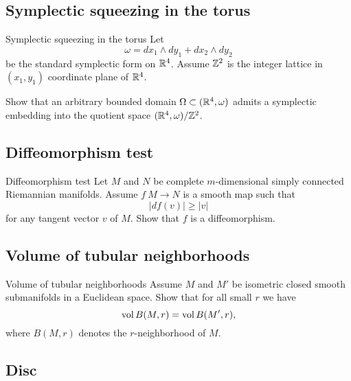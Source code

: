 \subsection*{Symplectic squeezing in the torus}




\begin{pr}{}{Symplectic squeezing in the torus}\label{Symplectic squeezing in the torus}
Let 
\[\omega=dx_1\wedge dy_1+ dx_2\wedge dy_2\]
be the standard symplectic form on $\mathbb{R}^4$.
Assume $\mathbb{Z}^2$ is the integer lattice in $(x_1,y_1)$ coordinate plane of $\mathbb{R}^4$.

Show that an arbitrary bounded domain $\Omega\subset (\mathbb{R}^4,\omega)$
admits a symplectic embedding into the quotient space $(\mathbb{R}^4,\omega)/\mathbb{Z}^2$. 
\end{pr}

\subsection*{Diffeomorphism test\easy}



\begin{pr}{\easy}{Diffeomorphism test}\label{Diffeomorphism test}
Let $M$ and $N$ be 
complete 
$m$-dimensional
simply connected 
Riemannian manifolds.
Assume $f\:M\to N$
is a smooth map such that 
$$|df(v)|\ge |v|$$
for any tangent vector $v$ of $M$.
Show that $f$ is a diffeomorphism.
\end{pr}

\subsection*{Volume of tubular neighborhoods}

\begin{pr}{}{Volume of tubular neighborhoods}\label{Volume of tubular neighborhoods}
Assume $M$ and $M'$ be isometric closed smooth submanifolds in a Euclidean space.
Show that for all small $r$ we have
$$\operatorname{\rm vol} B(M,r)=\operatorname{\rm vol} B(M',r),$$
where $B(M,r)$ denotes the $r$-neighborhood of $M$.
\end{pr}

\subsection*{Disc\hard}

